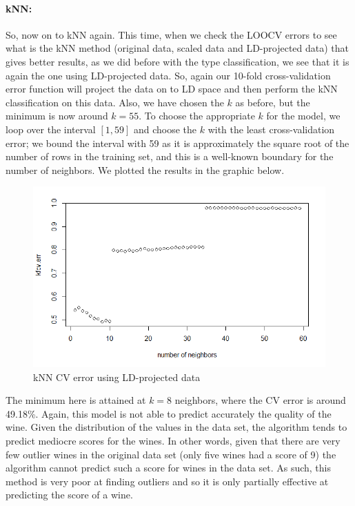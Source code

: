 \documentclass[10pt]{article}
\begin{document}
\paragraph{kNN:} So, now on to kNN again. This time, when we check the LOOCV errors to see what is the kNN method (original data, scaled data and LD-projected data) that gives better results, as we did before with the type classification, we see that it is again the one using LD-projected data. So, again our 10-fold cross-validation error function will project the data on to LD space and then perform the kNN classification on this data. Also, we have chosen the $k$ as before, but the minimum is now around $k=55$. To choose the appropriate $k$ for the model, we loop over the interval $[1,59]$ and choose the $k$ with the least cross-validation error; we bound the interval with 59 as it is approximately the square root of the number of rows in the training set, and this is a well-known boundary for the number of neighbors. We plotted the results in the graphic below.

\begin{figure}[H]
\centering
\caption{kNN CV error using LD-projected data}
\includegraphics[scale=0.5]{kNN_kfcv_err_qclass}
\end{figure}

The minimum here is attained at $k=8$ neighbors, where the CV error is around 49.18\%. Again, this model is not able to predict accurately the quality of the wine. Given the distribution of the values in the data set, the algorithm tends to predict mediocre scores for the wines. In other words, given that there are very few outlier wines in the original data set (only five wines had a score of 9) the algorithm cannot predict such a score for wines in the data set. As such, this method is very poor at finding outliers and so it is only partially effective at predicting the score of a wine.
\end{document}
